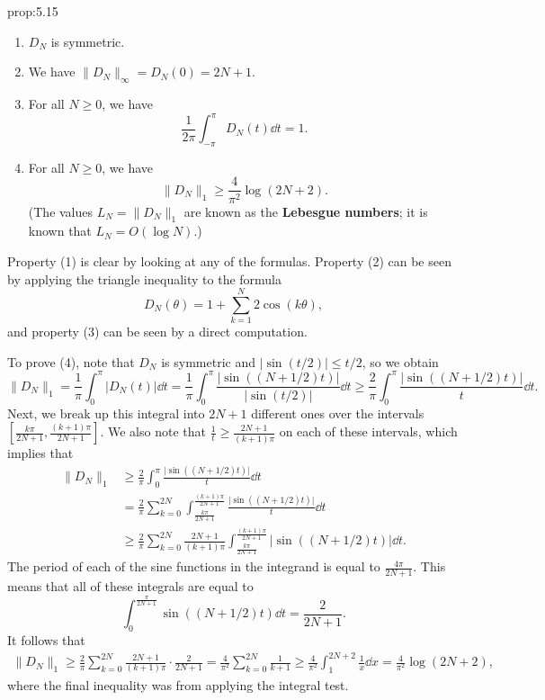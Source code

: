 \begin{prop}{prop:5.15}
    \begin{enumerate}[(1)]
        \item $D_N$ is symmetric. 
        \item We have $\|D_N\|_\infty = D_N(0) = 2N+1$. 
        \item For all $N \geq 0$, we have 
        \[ \frac{1}{2\pi} \int_{-\pi}^\pi D_N(t)\dd t = 1. \] 
        \item For all $N \geq 0$, we have 
        \[ \|D_N\|_1 \geq \frac{4}{\pi^2} \log(2N+2). \] 
        (The values $L_N = \|D_N\|_1$ are known as the {\bf Lebesgue numbers}; 
        it is known that $L_N = O(\log N)$.)
    \end{enumerate}
\end{prop}
\begin{pf}
    Property (1) is clear by looking at any of the formulas. Property (2) can be 
    seen by applying the triangle inequality to the formula 
    \[ D_N(\theta) = 1 + \sum_{k=1}^N 2\cos(k\theta), \] 
    and property (3) can be seen by a direct computation. 

    To prove (4), note that $D_N$ is symmetric and $\lvert \sin(t/2) \rvert \leq t/2$, 
    so we obtain 
    \[ \|D_N\|_1 = \frac1\pi \int_0^\pi |D_N(t)|\dd t 
    = \frac1\pi \int_0^\pi \frac{\lvert\sin((N+1/2)t)\rvert}{\lvert\sin(t/2)\rvert}\dd t 
    \geq \frac{2}{\pi} \int_0^\pi \frac{\lvert\sin((N+1/2)t)\rvert}{t}\dd t. \] 
    Next, we break up this integral into $2N+1$ different ones over the intervals 
    $[\frac{k\pi}{2N+1}, \frac{(k+1)\pi}{2N+1}]$. We also note that 
    $\frac1t \geq \frac{2N+1}{(k+1)\pi}$ on each of these intervals, which implies that 
    \begin{align*}
        \|D_N\|_1 
        &\geq \frac{2}{\pi} \int_0^\pi \frac{\lvert\sin((N+1/2)t)\rvert}{t}\dd t \\ 
        &= \frac{2}{\pi} \sum_{k=0}^{2N} \int_{\frac{k\pi}{2N+1}}^{\frac{(k+1)\pi}{2N+1}} 
        \frac{\lvert\sin((N+1/2)t)\rvert}{t}\dd t \\ 
        &\geq \frac{2}{\pi} \sum_{k=0}^{2N} \frac{2N+1}{(k+1)\pi} 
        \int_{\frac{k\pi}{2N+1}}^{\frac{(k+1)\pi}{2N+1}} \lvert\sin((N+1/2)t)\rvert\dd t. 
    \end{align*}
    The period of each of the sine functions in the integrand is equal to 
    $\frac{4\pi}{2N+1}$. This means that all of these integrals are equal to 
    \[ \int_0^{\frac{\pi}{2N+1}} \sin((N+1/2)t)\dd t = \frac{2}{2N+1}. \] 
    It follows that 
    \begin{align*}
        \|D_N\|_1 \geq \frac{2}{\pi} \sum_{k=0}^{2N} \frac{2N+1}{(k+1)\pi} \cdot \frac{2}{2N+1} 
        = \frac{4}{\pi^2} \sum_{k=0}^{2N} \frac{1}{k+1} 
        \geq \frac{4}{\pi^2} \int_1^{2N+2} \frac1x\dd x 
        = \frac{4}{\pi^2} \log(2N+2), 
    \end{align*}
    where the final inequality was from applying the integral test. 
\end{pf}

